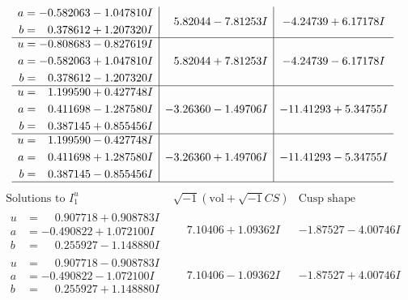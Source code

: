 \documentclass[1p]{elsarticle_modified}
\theoremstyle{definition}
\newcommand{\I}{\sqrt{-1}}
\begin{document}
$$\begin{array}{c|c|c}
\begin{aligned}
a &= -0.582063 - 1.047810 I \\
b &= \phantom{-}0.378612 + 1.207320 I\end{aligned}
 & \phantom{-}5.82044 - 7.81253 I & -4.24739 + 6.17178 I \\ \hline\begin{aligned}
u &= -0.808683 - 0.827619 I \\
a &= -0.582063 + 1.047810 I \\
b &= \phantom{-}0.378612 - 1.207320 I\end{aligned}
 & \phantom{-}5.82044 + 7.81253 I & -4.24739 - 6.17178 I \\ \hline\begin{aligned}
u &= \phantom{-}1.199590 + 0.427748 I \\
a &= \phantom{-}0.411698 - 1.287580 I \\
b &= \phantom{-}0.387145 + 0.855456 I\end{aligned}
 & -3.26360 - 1.49706 I & -11.41293 + 5.34755 I \\ \hline\begin{aligned}
u &= \phantom{-}1.199590 - 0.427748 I \\
a &= \phantom{-}0.411698 + 1.287580 I \\
b &= \phantom{-}0.387145 - 0.855456 I\end{aligned}
 & -3.26360 + 1.49706 I & -11.41293 - 5.34755 I\\
 \hline 
 \end{array}$$\newpage$$\begin{array}{c|c|c}  
\text{Solutions to }I^u_{1}& \I (\text{vol} + \sqrt{-1}CS) & \text{Cusp shape}\\
 \hline 
\begin{aligned}
u &= \phantom{-}0.907718 + 0.908783 I \\
a &= -0.490822 + 1.072100 I \\
b &= \phantom{-}0.255927 - 1.148880 I\end{aligned}
 & \phantom{-}7.10406 + 1.09362 I & -1.87527 - 4.00746 I \\ \hline\begin{aligned}
u &= \phantom{-}0.907718 - 0.908783 I \\
a &= -0.490822 - 1.072100 I \\
b &= \phantom{-}0.255927 + 1.148880 I\end{aligned}
 & \phantom{-}7.10406 - 1.09362 I & -1.87527 + 4.00746 I \\ \hline\begin{aligned}

\end{aligned}
\end{array}$$
\end{document}
